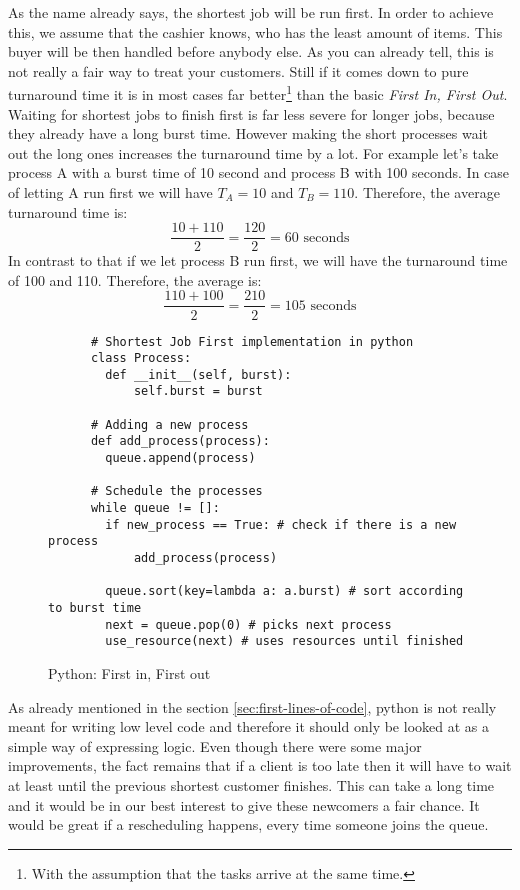 As the name already says, the shortest job will be run first.
In order to achieve this, we assume that the cashier knows, who has the least amount of items.
This buyer will be then handled before anybody else. As you can already tell, this is not really a fair way to treat your customers.
Still if it comes down to pure turnaround time it is in most cases far better\footnote{With the assumption that the tasks arrive at the same time.} than the basic \emph{First In, First Out}.
Waiting for shortest jobs to finish first is far less severe for longer jobs, because they already have a long burst time. However making the short processes wait out the long ones increases the turnaround time by a lot.
For example let's take process A with a burst time of 10 second and process B with 100 seconds. In case of letting A run first we will have $T_A = 10$ and $T_B = 110$.
Therefore, the average turnaround time is:
$$\frac{10 + 110}{2} = \frac{120}{2} = 60 \text{ seconds}$$
In contrast to that if we let process B run first, we will have the turnaround time of 100 and 110. Therefore, the average is:
$$\frac{110 + 100}{2} = \frac{210}{2} = 105 \text{ seconds}$$



\begin{figure}[h]
    \begin{verbatim}
      # Shortest Job First implementation in python
      class Process:
        def __init__(self, burst):
            self.burst = burst

      # Adding a new process
      def add_process(process):
        queue.append(process)

      # Schedule the processes
      while queue != []:
        if new_process == True: # check if there is a new process
            add_process(process)
        
        queue.sort(key=lambda a: a.burst) # sort according to burst time
        next = queue.pop(0) # picks next process
        use_resource(next) # uses resources until finished
    \end{verbatim}
    \caption{Python: First in, First out}
    \label{code:sjf}
\end{figure}

As already mentioned in the section \ref{sec:first-lines-of-code}, python is not really meant for writing low level code and therefore it should only be looked at as a simple way of expressing logic.
Even though there were some major improvements, the fact remains that if a client is too late then it will have to wait at least  until the previous shortest customer finishes. This can take a long time and it would be in our best interest to give these newcomers a fair chance. 
It would be great if a rescheduling happens, every time someone joins the queue.

